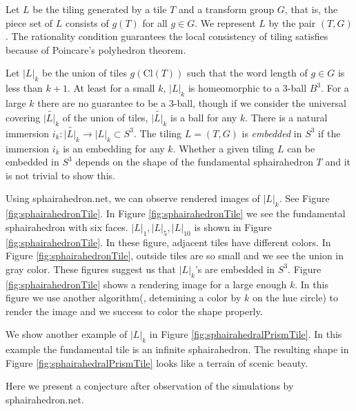 \documentclass[suppldata, dvipdfmx]{interact}
\theoremstyle{plain}%
\theoremstyle{definition}
\theoremstyle{remark}
\theoremstyle{problemstyle}
\begin{document}
Let $L$ be the tiling generated by a tile $T$ and a transform group $G$, that is, the piece set of $L$ consists of $g(T)$ for all $g\in G$.  We represent $L$ by the pair $(T,G)$.  The rationality condition guarantees the local consistency of tiling satisfies because of Poincare's polyhedron theorem.  

Let $|L|_k$ be the union of tiles $g(\text{Cl}(T))$ such that the word length of $g\in G$ is less than $k+1$.  At least for a small $k$, $|L|_k$ is homeomorphic to a 3-ball $B^3$.  For a large $k$ there are no guarantee to be a 3-ball, though if we consider the universal covering $\widetilde{|L|_k}$ of the union of tiles, $\widetilde{|L|_k}$ is a ball for any $k$.  There is a natural immersion $i_k:\widetilde{|L|_k}\to|L|_k\subset S^3$.  The tiling $L=(T,G)$ is {\it embedded} in $S^3$ if the immersion $i_k$ is an embedding for any $k$.  Whether a given tiling $L$ can be embedded in $S^3$ depends on the shape of the fundamental sphairahedron $T$ and it is not trivial to show this.  

Using sphairahedron.net\cite{sphairahedron_net}, we can observe rendered images of $|L|_k$.  See Figure \ref{fig:sphairahedronTile}.   In Figure
\ref{fig:sphairahedronTile} we see the fundamental sphairahedron with six faces.  $|L|_1, |L|_5, |L|_{10}$ is shown in Figure
\ref{fig:sphairahedronTile}.  In these figure, adjacent tiles have different colors.  In Figure \ref{fig:sphairahedronTile}, outside tiles are so small and we see the union in gray color.  These figures suggest us that $|L|_k$'s are embedded in $S^3$.  Figure \ref{fig:sphairahedronTile} shows a rendering image for a large enough $k$.  In this figure we use another algorithm(, detemining a color by $k$ on the hue circle) to render the image and we success to color the shape properly. 

We show another example of $|L|_k$ in Figure \ref{fig:sphairahedralPrismTile}.  In this example the fundamental tile is an infinite sphairahedron.  The resulting shape in Figure \ref{fig:sphairahedralPrismTile} looks like a terrain of scenic beauty.

Here we present a conjecture after observation of the simulations by sphairahedron.net\cite{sphairahedron_net}.
\end{document}
